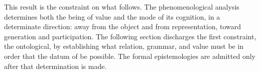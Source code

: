 \noindent
This result is the constraint on what follows. The phenomenological analysis determines both the being of value and the mode of its cognition, in a determinate direction: away from the object and from representation, toward generation and participation. The following section discharges the first constraint, the ontological, by establishing what relation, grammar, and value must be in order that the datum of  be possible. The formal epistemologies are admitted only after that determination is made.
